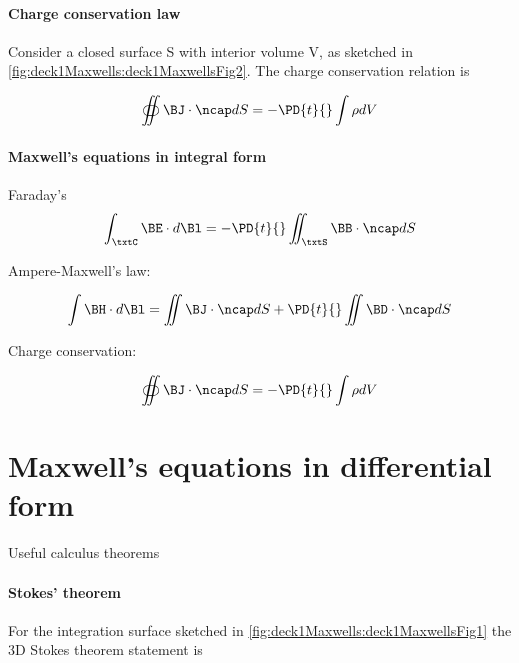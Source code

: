 \paragraph{Charge conservation law}
Consider a closed surface S with interior volume V, as sketched in \cref{fig:deck1Maxwells:deck1MaxwellsFig2}.  The charge conservation relation is


\begin{equation}\label{eqn:uwavesLecture1:60}
\oiint \BJ \cdot \ncap dS = -\PD{t}{} \int \rho dV
\end{equation}
\paragraph{Maxwell's equations in integral form}

Faraday's
\begin{equation}\label{eqn:uwavesLecture1:80}
\int_\txtC \BE \cdot d\Bl = - \PD{t}{} \iint_\txtS \BB \cdot \ncap dS
\end{equation}

Ampere-Maxwell's law:

\begin{equation}\label{eqn:uwavesLecture1:100}
\int \BH \cdot d\Bl = \iint \BJ \cdot \ncap dS + \PD{t}{} \iint \BD \cdot \ncap dS
\end{equation}

Charge conservation:

\begin{equation}\label{eqn:uwavesLecture1:120}
\oiint \BJ \cdot \ncap dS = -\PD{t}{} \int \rho dV
\end{equation}

\section{Maxwell's equations in differential form}

Useful calculus theorems

\paragraph{Stokes' theorem}

For the integration surface sketched in \cref{fig:deck1Maxwells:deck1MaxwellsFig1} the 3D Stokes theorem statement is

